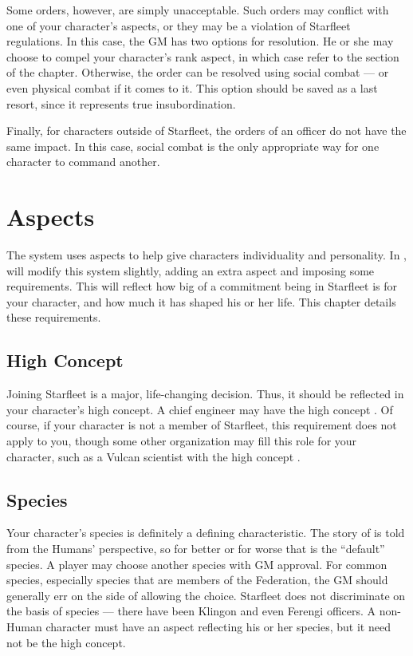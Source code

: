 \documentclass[12pt,titlepage,openany]{book}
\begin{document}
Some orders, however, are simply unacceptable. Such orders may conflict with
one of your character's aspects, or they may be a violation of Starfleet
regulations. In this case, the GM has two options for resolution. He or she
may choose to compel your character's rank aspect, in which case refer to the
 section of the  chapter.
Otherwise, the order can be resolved using social combat --- or even physical
combat if it comes to it. This option should be saved as a last resort, since
it represents true insubordination.

Finally, for characters outside of Starfleet, the orders of an officer do not
have the same impact. In this case, social combat is the only appropriate way
for one character to command another.



\chapter{Aspects}\label{chap:aspects}

The \FateCore{} system uses aspects to help give characters individuality and
personality. In \StarTrekFate{}, will modify this system slightly, adding an
extra aspect and imposing some requirements. This will reflect how big of a
commitment being in Starfleet is for your character, and how much it has
shaped his or her life. This chapter details these requirements.

\section{High Concept}\label{sec:high-concept}

Joining Starfleet is a major, life-changing decision. Thus, it should be
reflected in your character's high concept. A chief engineer may have the high
concept . Of course, if your character is not a
member of Starfleet, this requirement does not apply to you, though some other
organization may fill this role for your character, such as a Vulcan scientist
with the high concept .

\section{Species}\label{sec:species}

Your character's species is definitely a defining characteristic. The story of
\StarTrek{} is told from the Humans' perspective, so for better or for worse
that is the ``default'' species. A player may choose another species with GM
approval. For common species, especially species that are members of the
Federation, the GM should generally err on the side of allowing the choice.
Starfleet does not discriminate on the basis of species --- there have been
Klingon and even Ferengi officers. A non-Human character must have an aspect
reflecting his or her species, but it need not be the high concept.
\end{document}
